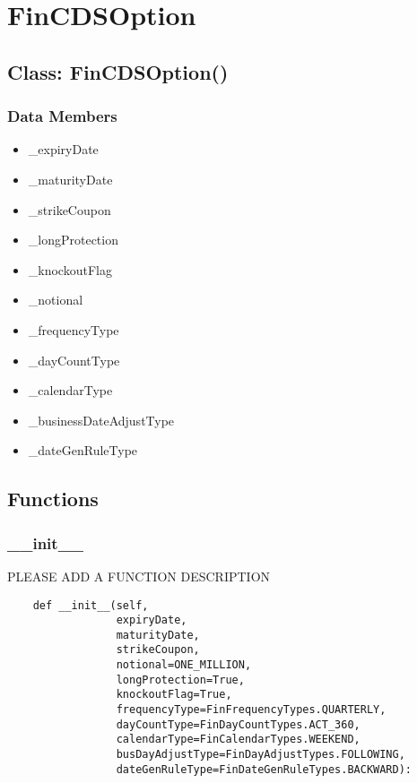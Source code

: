 \documentclass[twoside,11pt]{book}
\begin{document}
\newpage
\section{FinCDSOption}

\subsection*{Class: FinCDSOption()}


\subsubsection*{Data Members}
\begin{itemize}
\item{\_expiryDate}
\item{\_maturityDate}
\item{\_strikeCoupon}
\item{\_longProtection}
\item{\_knockoutFlag}
\item{\_notional}
\item{\_frequencyType}
\item{\_dayCountType}
\item{\_calendarType}
\item{\_businessDateAdjustType}
\item{\_dateGenRuleType}
\end{itemize}

\subsection*{Functions}

\subsubsection*{{\bf \_\_init\_\_}}
PLEASE ADD A FUNCTION DESCRIPTION

\begin{lstlisting}
    def __init__(self,
                 expiryDate,
                 maturityDate,
                 strikeCoupon,
                 notional=ONE_MILLION,
                 longProtection=True,
                 knockoutFlag=True,
                 frequencyType=FinFrequencyTypes.QUARTERLY,
                 dayCountType=FinDayCountTypes.ACT_360,
                 calendarType=FinCalendarTypes.WEEKEND,
                 busDayAdjustType=FinDayAdjustTypes.FOLLOWING,
                 dateGenRuleType=FinDateGenRuleTypes.BACKWARD):
\end{lstlisting}
\end{document}
